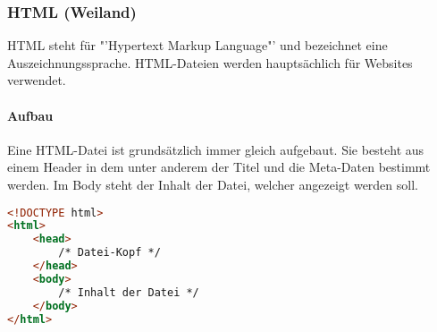 \subsubsection{HTML (Weiland)}

HTML steht für "'Hypertext Markup Language"' und bezeichnet eine Auszeichnungssprache. HTML-Dateien werden hauptsächlich für Websites verwendet.


\paragraph{Aufbau}

Eine HTML-Datei ist grundsätzlich immer gleich aufgebaut. Sie besteht aus einem Header in dem unter anderem der Titel und die Meta-Daten bestimmt werden.
Im Body steht der Inhalt der Datei, welcher angezeigt werden soll. 
\begin{lstlisting}[style=custom, language=HTML, caption={HTML-Tags}]
<!DOCTYPE html>
<html> 
	<head>
		/* Datei-Kopf */
	</head>
	<body>
		/* Inhalt der Datei */
	</body>
</html>
\end{lstlisting}

